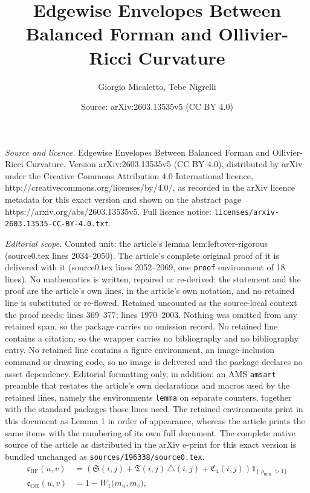 \documentclass[10pt,a4paper]{amsart}
\title{Edgewise Envelopes Between Balanced Forman and Ollivier-Ricci Curvature}
\author{Giorgio Micaletto, Tebe Nigrelli}
\date{Source: arXiv:2603.13535v5 (CC BY 4.0)}
\begin{document}
\maketitle

\noindent\emph{Source and licence.} Edgewise Envelopes Between Balanced Forman and Ollivier-Ricci Curvature. Version arXiv:2603.13535v5 (CC BY 4.0), distributed by arXiv under the Creative Commons Attribution 4.0 International licence, http://creativecommons.org/licenses/by/4.0/, as recorded in the arXiv licence metadata for this exact version and shown on the abstract page https://arxiv.org/abs/2603.13535v5. Full licence notice: \texttt{licenses/arxiv-2603.13535-CC-BY-4.0.txt}.\par\smallskip

\noindent\textit{Editorial scope.} Counted unit: the article's lemma lem:leftover-rigorous (source0.tex lines 2034--2050). The article's complete original proof of it is delivered with it (source0.tex lines 2052--2069, one \texttt{proof} environment of 18 lines). No mathematics is written, repaired or re-derived: the statement and the proof are the article's own lines, in the article's own notation, and no retained line is substituted or re-flowed.  Retained uncounted as the source-local context the proof needs: lines 369--377; lines 1970--2003.  Nothing was omitted from any retained span, so the package carries no omission record.  No retained line contains a citation, so the wrapper carries no bibliography and no bibliography entry.  No retained line contains a figure environment, an image-inclusion command or drawing code, so no image is delivered and the package declares no asset dependency.  Editorial formatting only, in addition: an AMS \texttt{amsart} preamble that restates the article's own declarations and macros used by the retained lines, namely the environments \texttt{lemma} on separate counters, together with the standard packages those lines need.  The retained environments print in this document as Lemma 1 in order of appearance, whereas the article prints the same items with the numbering of its own full document.  The complete native source of the article as distributed in the arXiv e-print for this exact version is bundled unchanged as \texttt{sources/196338/source0.tex}.
\begin{align}
\mathfrak c_{\mathrm{BF}}(u,v)
&= \left(\mathfrak S(i,j)+\mathfrak T(i,j)\,\triangle(i,j)+\mathfrak C_4(i,j)\right)\mathds{1}_{\{\varrho_{\min}>1\}}
\label{eq:BF-lower-decomp}
\\[5pt]
\mathfrak c_{\mathrm{OR}}(u,v)
&=1-W_1\!\bigl(m_u,m_v\bigr),
\label{eq:cOR}
\end{align}
\end{document}
